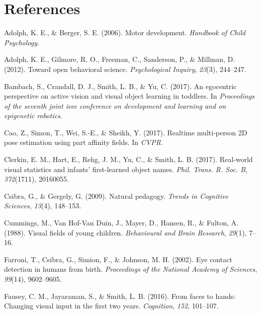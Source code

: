 \documentclass[10pt, letterpaper]{article}
\begin{document}
\vspace{1em}

\section{References}\label{references}

\setlength{\parindent}{-0.1in} \setlength{\leftskip}{0.125in} \noindent

\hypertarget{refs}{}
\hypertarget{ref-adolph2006motor}{}
Adolph, K. E., \& Berger, S. E. (2006). Motor development.
\emph{Handbook of Child Psychology}.

\hypertarget{ref-adolph2012toward}{}
Adolph, K. E., Gilmore, R. O., Freeman, C., Sanderson, P., \& Millman,
D. (2012). Toward open behavioral science. \emph{Psychological Inquiry},
\emph{23}(3), 244--247.

\hypertarget{ref-bambach2017}{}
Bambach, S., Crandall, D. J., Smith, L. B., \& Yu, C. (2017). An
egocentric perspective on active vision and visual object learning in
toddlers. In \emph{Proceedings of the seventh joint ieee conference on
development and learning and on epigenetic robotics}.

\hypertarget{ref-cao2017realtime}{}
Cao, Z., Simon, T., Wei, S.-E., \& Sheikh, Y. (2017). Realtime
multi-person 2D pose estimation using part affinity fields. In
\emph{CVPR}.

\hypertarget{ref-clerkin2017}{}
Clerkin, E. M., Hart, E., Rehg, J. M., Yu, C., \& Smith, L. B. (2017).
Real-world visual statistics and infants' first-learned object names.
\emph{Phil. Trans. R. Soc. B}, \emph{372}(1711), 20160055.

\hypertarget{ref-csibra2009natural}{}
Csibra, G., \& Gergely, G. (2009). Natural pedagogy. \emph{Trends in
Cognitive Sciences}, \emph{13}(4), 148--153.

\hypertarget{ref-cummings1988}{}
Cummings, M., Van Hof-Van Duin, J., Mayer, D., Hansen, R., \& Fulton, A.
(1988). Visual fields of young children. \emph{Behavioural and Brain
Research}, \emph{29}(1), 7--16.

\hypertarget{ref-farroni2002eye}{}
Farroni, T., Csibra, G., Simion, F., \& Johnson, M. H. (2002). Eye
contact detection in humans from birth. \emph{Proceedings of the
National Academy of Sciences}, \emph{99}(14), 9602--9605.

\hypertarget{ref-fausey2016}{}
Fausey, C. M., Jayaraman, S., \& Smith, L. B. (2016). From faces to
hands: Changing visual input in the first two years. \emph{Cognition},
\emph{152}, 101--107.
\end{document}
